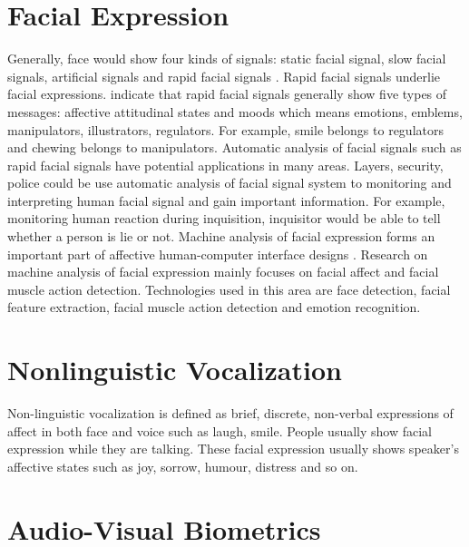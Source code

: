 \section{Facial Expression}
Generally, face would show four kinds of signals: static facial signal, slow facial signals, artificial signals and rapid facial signals \cite{pantic2007machine}. Rapid facial signals underlie facial expressions. \cite{pantic2007machine} indicate that rapid facial signals generally show five types of messages: affective attitudinal states and moods which means emotions, emblems, manipulators, illustrators, regulators. For example, smile belongs to regulators and chewing belongs to manipulators. Automatic analysis of facial signals such as rapid facial signals have potential applications in many areas. Layers, security, police could be use automatic analysis of facial signal system to monitoring and interpreting human facial signal and gain important information. For example, monitoring human reaction during inquisition, inquisitor would be able to tell whether a person is lie or not.  Machine analysis of facial expression forms an important part of affective human-computer interface designs \cite{pantic2007machine}.  Research on machine analysis of facial expression mainly focuses on facial affect and facial muscle action detection\cite{pantic2007machine}. Technologies used in this area are face detection, facial feature extraction, facial muscle action detection and emotion recognition\cite{pantic2007machine}.
\section{Nonlinguistic Vocalization}
Non-linguistic vocalization is defined as brief, discrete, non-verbal expressions of affect in both face and voice \cite{petridis2011audiovisual} such as laugh, smile. People usually show facial expression while they are talking. These facial expression usually shows speaker's affective states such as joy, sorrow, humour, distress and so on.
\section{Audio-Visual Biometrics}
